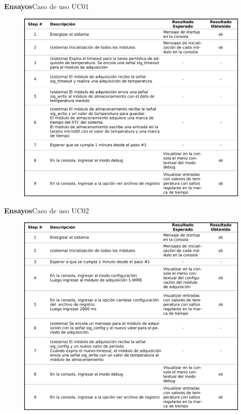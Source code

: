\documentclass[11pt, xcolor={table,xcdraw}]{beamer}
\begin{document}
\begin{frame}[t]{\textbf{\LARGE{Ensayos}}}{Caso de uso UC01}
	\vspace{-.7cm}
	\begin{figure}[H]
	  \includegraphics[width=.77\textwidth]{./imagenes/UseCase_detalle1.png}
	\end{figure}	
\end{frame}

\begin{frame}[t]{\textbf{\LARGE{Ensayos}}}{Caso de uso UC02}
	\vspace{-.7cm}
	\begin{figure}[H]
	  \includegraphics[width=.77\textwidth]{./imagenes/UseCase_detalle2.png}
	\end{figure}	
\end{frame}
\end{document}
